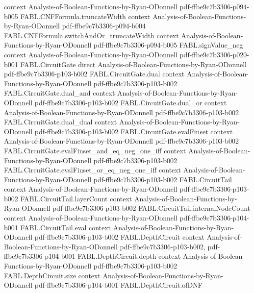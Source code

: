 \begin{theorem}
  {context}
  {Analysis-of-Boolean-Functions-by-Ryan-ODonnell}
  {pdf-ffbe9c7b3306-p094-b005}
\proofstep
  {FABL.CNFFormula.truncateWidth}
  {context}
  {Analysis-of-Boolean-Functions-by-Ryan-ODonnell}
  {pdf-ffbe9c7b3306-p094-b004}
\proofstep
  {FABL.CNFFormula.switchAndOr_truncateWidth}
  {context}
  {Analysis-of-Boolean-Functions-by-Ryan-ODonnell}
  {pdf-ffbe9c7b3306-p094-b005}
\proofstep
  {FABL.signValue_neg}
  {context}
  {Analysis-of-Boolean-Functions-by-Ryan-ODonnell}
  {pdf-ffbe9c7b3306-p020-b001}
\proofstep
  {FABL.CircuitGate}
  {direct}
  {Analysis-of-Boolean-Functions-by-Ryan-ODonnell}
  {pdf-ffbe9c7b3306-p103-b002}
\proofstep
  {FABL.CircuitGate.dual}
  {context}
  {Analysis-of-Boolean-Functions-by-Ryan-ODonnell}
  {pdf-ffbe9c7b3306-p103-b002}
\proofstep
  {FABL.CircuitGate.dual_and}
  {context}
  {Analysis-of-Boolean-Functions-by-Ryan-ODonnell}
  {pdf-ffbe9c7b3306-p103-b002}
\proofstep
  {FABL.CircuitGate.dual_or}
  {context}
  {Analysis-of-Boolean-Functions-by-Ryan-ODonnell}
  {pdf-ffbe9c7b3306-p103-b002}
\proofstep
  {FABL.CircuitGate.dual_dual}
  {context}
  {Analysis-of-Boolean-Functions-by-Ryan-ODonnell}
  {pdf-ffbe9c7b3306-p103-b002}
\proofstep
  {FABL.CircuitGate.evalFinset}
  {context}
  {Analysis-of-Boolean-Functions-by-Ryan-ODonnell}
  {pdf-ffbe9c7b3306-p103-b002}
\proofstep
  {FABL.CircuitGate.evalFinset_and_eq_neg_one_iff}
  {context}
  {Analysis-of-Boolean-Functions-by-Ryan-ODonnell}
  {pdf-ffbe9c7b3306-p103-b002}
\proofstep
  {FABL.CircuitGate.evalFinset_or_eq_neg_one_iff}
  {context}
  {Analysis-of-Boolean-Functions-by-Ryan-ODonnell}
  {pdf-ffbe9c7b3306-p103-b002}
\proofstep
  {FABL.CircuitTail}
  {context}
  {Analysis-of-Boolean-Functions-by-Ryan-ODonnell}
  {pdf-ffbe9c7b3306-p103-b002}
\proofstep
  {FABL.CircuitTail.layerCount}
  {context}
  {Analysis-of-Boolean-Functions-by-Ryan-ODonnell}
  {pdf-ffbe9c7b3306-p103-b002}
\proofstep
  {FABL.CircuitTail.internalNodeCount}
  {context}
  {Analysis-of-Boolean-Functions-by-Ryan-ODonnell}
  {pdf-ffbe9c7b3306-p104-b001}
\proofstep
  {FABL.CircuitTail.eval}
  {context}
  {Analysis-of-Boolean-Functions-by-Ryan-ODonnell}
  {pdf-ffbe9c7b3306-p103-b002}
\proofstep
  {FABL.DepthCircuit}
  {context}
  {Analysis-of-Boolean-Functions-by-Ryan-ODonnell}
  {pdf-ffbe9c7b3306-p103-b002,
    pdf-ffbe9c7b3306-p104-b001}
\proofstep
  {FABL.DepthCircuit.depth}
  {context}
  {Analysis-of-Boolean-Functions-by-Ryan-ODonnell}
  {pdf-ffbe9c7b3306-p103-b002}
\proofstep
  {FABL.DepthCircuit.size}
  {context}
  {Analysis-of-Boolean-Functions-by-Ryan-ODonnell}
  {pdf-ffbe9c7b3306-p104-b001}
\proofstep
  {FABL.DepthCircuit.ofDNF}

\end{theorem}
